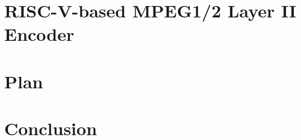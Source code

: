 \documentclass{esda}
\begin{document}
\cleardoublepage
\section{RISC-V-based MPEG1/2 Layer II Encoder}
\label{sec:curr}


\cleardoublepage
\section{Plan}
\label{sec:plan}


\cleardoublepage
\section{Conclusion}
\label{sec:conc}


\cleardoublepage
{}

\end{document}
